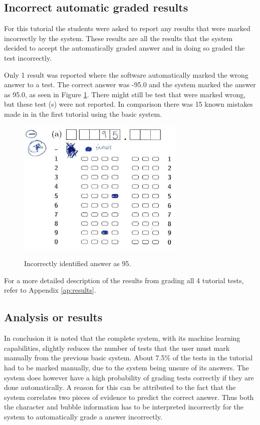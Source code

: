 \subsection{Incorrect automatic graded results}

For this tutorial the students were asked to report any results that were marked incorrectly by the system. These results are all the results that the system decided to accept the automatically graded answer and in doing so graded the test incorrectly.

Only 1 result was reported where the software automatically marked the wrong answer to a test. The correct answer was -95.0 and the system marked the answer as 95.0, as seen in Figure \ref{fig:wrongAns}. There might still be test that were marked wrong, but these test (s) were not reported. In comparison there was 15 known mistakes made in in the first tutorial using the basic system.

\begin{figure}
  \centering
  \includegraphics[width=8cm]{wrongResult}\\
  \caption{Incorrectly identified answer as 95.}
  \label{fig:wrongAns}
\end{figure}

For a more detailed description of the results from grading all 4 tutorial tests, refer to Appendix \ref{ap:results}.

\subsection{Analysis or results}

In conclusion it is noted that the complete system, with its machine learning capabilities, slightly reduces the number of tests that the user must mark manually from the previous basic system. About 7.5\% of the tests in the tutorial had to be marked manually, due to the system being unsure of its answers. The system does however have a high probability of grading tests correctly if they are done automatically. A reason for this can be attributed to the fact that the system correlates two pieces of evidence to predict the correct answer. Thus both the character and bubble information has to be interpreted incorrectly for the system to automatically grade a answer incorrectly. 

